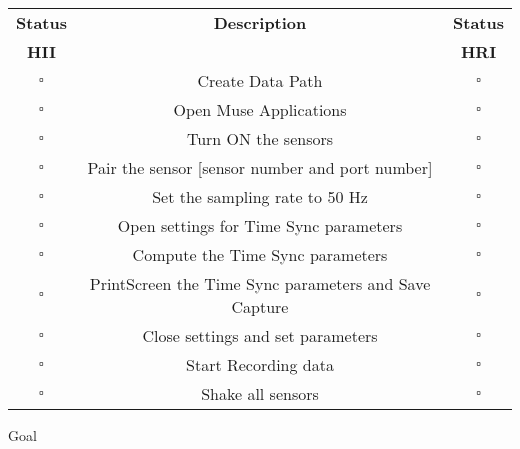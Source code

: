 \documentclass[a4paper]{article}
\begin{document}
\begin{tabular}{|c|c|c|}
\hline
\textbf{Status} & \textbf{Description} & \textbf{Status} \\
\textbf{HII} &  & \textbf{HRI} \\ \hline

$\square$ & Create Data Path & $\square$ \\ \hline
$\square$ & Open Muse Applications & $\square$ \\ \hline
$\square$ & Turn ON the sensors & $\square$  \\ \hline
$\square$ & Pair the sensor [sensor number and port number] & $\square$ \\ \hline

$\square$ & Set the sampling rate to 50 Hz  & $\square$ \\ \hline
$\square$ & Open settings for Time Sync parameters  & $\square$ \\ \hline
$\square$ & Compute the Time Sync parameters & $\square$ \\ \hline
$\square$ & PrintScreen the Time Sync parameters and Save Capture & $\square$ \\ \hline
$\square$ & Close settings and set parameters & $\square$ \\ \hline
$\square$ & Start Recording data & $\square$ \\ \hline
$\square$ & Shake all sensors & $\square$ \\ \hline

\end{tabular}





\begin{CheckList}{Goal}
\begin{minipage}[t]{0.5\textwidth}
\end{minipage}
\hspace{0.5cm}
\begin{minipage}[t]{0.5\textwidth}
\end{minipage}
\begin{minipage}[t]{0.5\textwidth}
\end{minipage}
\hspace{0.5cm}
\begin{minipage}[t]{0.5\textwidth}
\end{minipage}


\end{CheckList}
\end{document}

